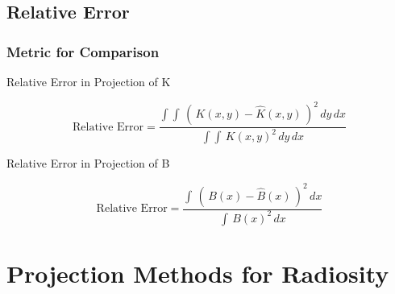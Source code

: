 


  \subsection{Relative Error}

    \begin{frame}\frametitle{Metric for Comparison}
        
        Relative Error in Projection of K
        
        \begin{equation}
        \text{Relative  Error}=\frac{\int\int \,(\,K(x,y)-\hat{K}(x,y)\,)^2  \,dy \, dx}{\int\int \,K(x,y)^2  \,dy \, dx}
        \end{equation}
        
        Relative Error in Projection of B
        
        \begin{equation}
        \text{Relative  Error}=\frac{\int \,(\,B(x)-\hat{B}(x)\,)^2  \,dx}{\int \,B(x)^2  \,dx}
        \end{equation}
    \end{frame}



\section{Projection Methods for Radiosity}

